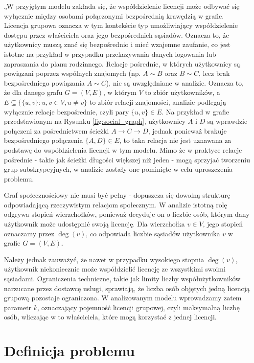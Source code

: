 „W przyjętym modelu zakłada się, że współdzielenie licencji może odbywać się wyłącznie między osobami połączonymi bezpośrednią krawędzią w grafie. Licencja grupowa oznacza w tym kontekście typ umożliwiający współdzielenie dostępu przez właściciela oraz jego bezpośrednich sąsiadów. Oznacza to, że użytkownicy muszą znać się bezpośrednio i mieć wzajemne zaufanie, co jest istotne na przykład w przypadku przekazywania danych logowania lub zapraszania do planu rodzinnego. Relacje pośrednie, w których użytkownicy są powiązani poprzez wspólnych znajomych (np. \( A \sim B \) oraz \( B \sim C \), lecz brak bezpośredniego powiązania \( A \sim C \)), nie są uwzględniane w analizie. Oznacza to, że dla danego grafu \( G = (V, E) \),
w którym \( V \) to zbiór użytkowników, a \( E \subseteq \{ \{u,v\} : u,v \in V, u \neq v \} \) to zbiór relacji znajomości, analizie podlegają wyłącznie relacje bezpośrednie, czyli pary \( \{u, v\} \in E \).
Na przykład w grafie przedstawionym na Rysunku \ref{fig:social_graph}, użytkownicy \( A \) i \( D \) są wprawdzie połączeni za pośrednictwem ścieżki \( A \rightarrow C \rightarrow D \), jednak ponieważ brakuje bezpośredniego połączenia \( \{A,D\} \in E \), to taka relacja nie jest uznawana za podstawę do współdzielenia licencji w tym modelu.
Mimo że w praktyce relacje pośrednie - takie jak ścieżki długości większej niż jeden - mogą sprzyjać tworzeniu grup subskrypcyjnych, w analizie zostały one pominięte w celu uproszczenia problemu.

Graf społecznościowy nie musi być pełny - dopuszcza się dowolną strukturę odpowiadającą rzeczywistym relacjom społecznym. W analizie istotną rolę odgrywa stopień wierzchołków, ponieważ decyduje on o liczbie osób, którym dany użytkownik może udostępnić swoją licencję. Dla wierzchołka \( v \in V \), jego stopień oznaczamy przez \( \deg(v) \), co odpowiada liczbie sąsiadów użytkownika \( v \) w grafie \( G = (V, E) \).

Należy jednak zauważyć, że nawet w przypadku wysokiego stopnia $\deg(v)$, użytkownik niekoniecznie może współdzielić licencję ze wszystkimi swoimi sąsiadami. Ograniczenia techniczne, takie jak limity liczby współużytkowników narzucane przez dostawcę usługi, sprawiają, że liczba osób objętych jedną licencją grupową pozostaje ograniczona. W analizowanym modelu wprowadzamy zatem parametr $k$, oznaczający pojemność licencji grupowej, czyli maksymalną liczbę osób, wliczając w to właściciela, które mogą korzystać z jednej licencji.



\section{Definicja problemu}

